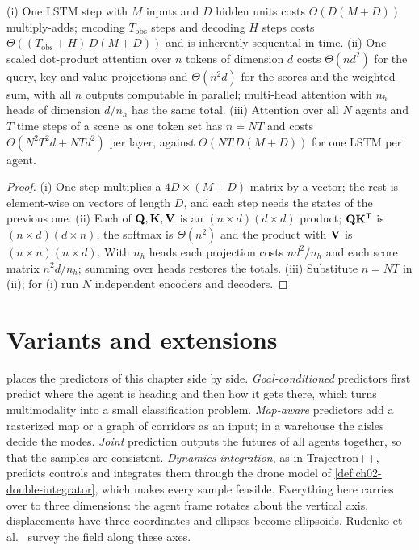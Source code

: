 \begin{proposition}
\label{thm:ch20-complexity}
(i) One LSTM step with $M$ inputs and $D$ hidden units costs
$\Theta(D(M + D))$ multiply-adds; encoding $T_{\mathrm{obs}}$ steps and
decoding $H$ steps costs $\Theta((T_{\mathrm{obs}} + H)\,D(M + D))$ and is
inherently sequential in time. (ii) One scaled dot-product attention over
$n$ tokens of dimension $d$ costs $\Theta(n d^2)$ for the query, key and
value projections and $\Theta(n^2 d)$ for the scores and the weighted sum,
with all $n$ outputs computable in parallel; multi-head attention with $n_h$
heads of dimension $d/n_h$ has the same total. (iii) Attention over all $N$
agents and $T$ time steps of a scene as one token set has $n = NT$ and costs
$\Theta(N^2 T^2 d + NT d^2)$ per layer, against $\Theta(NT\,D(M + D))$ for one
LSTM per agent.
\end{proposition}
\begin{proof}
(i) One step multiplies a $4D \times (M + D)$ matrix by a vector; the rest is
element-wise on vectors of length $D$, and each step needs the states of the
previous one. (ii) Each of $\mathbf{Q}, \mathbf{K}, \mathbf{V}$ is an $(n \times d)(d
\times d)$ product; $\mathbf{Q}\mathbf{K}^{\mathsf{T}}$ is $(n \times d)(d \times n)$, the
softmax is $\Theta(n^2)$ and the product with $\mathbf{V}$ is $(n \times n)(n
\times d)$. With $n_h$ heads each projection costs $n d^2/n_h$ and each score
matrix $n^2 d/n_h$; summing over heads restores the totals. (iii) Substitute
$n = NT$ in (ii); for (i) run $N$ independent encoders and decoders.
\end{proof}

\section{Variants and extensions}
\label{sec:ch20-variants}

 places the predictors of this chapter side by side.
\emph{Goal-conditioned} predictors first predict where the agent is heading
and then how it gets there, which turns multimodality into a small
classification problem. \emph{Map-aware} predictors add a rasterized map or a
graph of corridors as an input; in a warehouse the aisles decide the modes.
\emph{Joint} prediction outputs the futures of all agents together, so that
the samples are consistent. \emph{Dynamics integration}, as in Trajectron++,
predicts controls and integrates them through the drone model of
\cref{def:ch02-double-integrator}, which makes every sample feasible.
Everything here carries over to three dimensions: the agent frame rotates
about the vertical axis, displacements have three coordinates and ellipses
become ellipsoids. Rudenko et al.~\cite{rudenko2020human} survey the field
along these axes.

